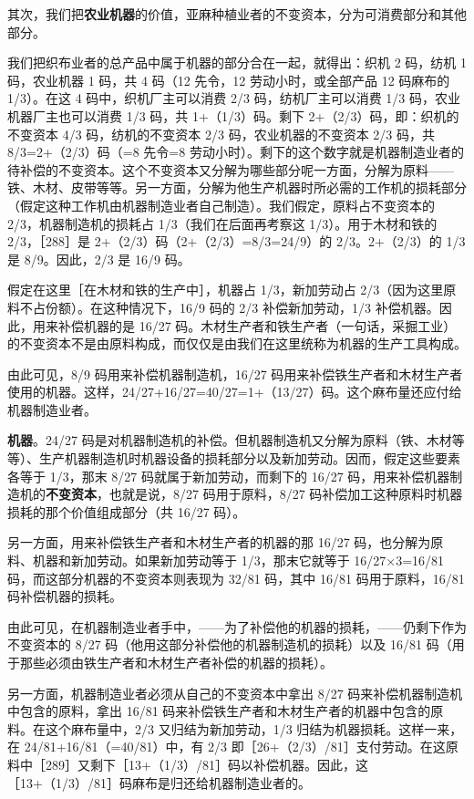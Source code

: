 \todo{}

其次，我们把\textbf{农业机器}的价值，亚麻种植业者的不变资本，分为可消费部分和其他部分。

\todo{}

我们把织布业者的总产品中属于机器的部分合在一起，就得出：织机 2 码，纺机 1 码，农业机器 1 码，共 4 码（12 先令，12 劳动小时，或全部产品 12 码麻布的 1/3）。在这 4 码中，织机厂主可以消费 2/3 码，纺机厂主可以消费 1/3 码，农业机器厂主也可以消费 1/3 码，共 1+（1/3）码。剩下 2+（2/3）码，即：织机的不变资本 4/3 码，纺机的不变资本 2/3 码，农业机器的不变资本 2/3 码，共 8/3=2+（2/3）码（=8 先令=8 劳动小时）。剩下的这个数字就是机器制造业者的待补偿的不变资本。这个不变资本又分解为哪些部分呢一方面，分解为原料——铁、木材、皮带等等。另一方面，分解为他生产机器时所必需的工作机的损耗部分（假定这种工作机由机器制造业者自己制造）。我们假定，原料占不变资本的 2/3，机器制造机的损耗占 1/3（我们在后面再考察这 1/3）。用于木材和铁的 2/3，［288］是 2+（2/3）码（2+（2/3）=8/3=24/9）的 2/3。2+（2/3）的 1/3 是 8/9。因此，2/3 是 16/9 码。

假定在这里［在木材和铁的生产中］，机器占 1/3，新加劳动占 2/3（因为这里原料不占份额）。在这种情况下，16/9 码的 2/3 补偿新加劳动，1/3 补偿机器。因此，用来补偿机器的是 16/27 码。木材生产者和铁生产者（一句话，采掘工业）的不变资本不是由原料构成，而仅仅是由我们在这里统称为机器的生产工具构成。

由此可见，8/9 码用来补偿机器制造机，16/27 码用来补偿铁生产者和木材生产者使用的机器。这样，24/27+16/27=40/27=1+（13/27）码。这个麻布量还应付给机器制造业者。

\textbf{机器}。24/27 码是对机器制造机的补偿。但机器制造机又分解为原料（铁、木材等等）、生产机器制造机时机器设备的损耗部分以及新加劳动。因而，假定这些要素各等于 1/3，那末 8/27 码就属于新加劳动，而剩下的 16/27 码，用来补偿机器制造机的\textbf{不变资本}，也就是说，8/27 码用于原料，8/27 码补偿加工这种原料时机器损耗的那个价值组成部分（共 16/27 码）。

另一方面，用来补偿铁生产者和木材生产者的机器的那 16/27 码，也分解为原料、机器和新加劳动。如果新加劳动等于 1/3，那末它就等于 16/27×3=16/81 码，而这部分机器的不变资本则表现为 32/81 码，其中 16/81 码用于原料，16/81 码补偿机器的损耗。

由此可见，在机器制造业者手中，——为了补偿他的机器的损耗，——仍剩下作为不变资本的 8/27 码（他用这部分补偿他的机器制造机的损耗）以及 16/81 码（用于那些必须由铁生产者和木材生产者补偿的机器的损耗）。

另一方面，机器制造业者必须从自己的不变资本中拿出 8/27 码来补偿机器制造机中包含的原料，拿出 16/81 码来补偿铁生产者和木材生产者的机器中包含的原料。在这个麻布量中，2/3 又归结为新加劳动，1/3 归结为机器损耗。这样一来，在 24/81+16/81（=40/81）中，有 2/3 即［26+（2/3）/81］支付劳动。在这原料中［289］又剩下［13+（1/3）/81］码以补偿机器。因此，这［13+（1/3）/81］码麻布是归还给机器制造业者的。

